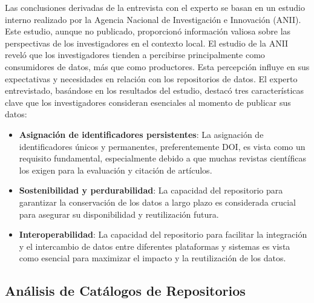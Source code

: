 \documentclass{article}
\begin{document}
Las conclusiones derivadas de la entrevista con el experto se basan en un estudio interno realizado por la Agencia Nacional de Investigación e Innovación (ANII). Este estudio, aunque no publicado, proporcionó información valiosa sobre las perspectivas de los investigadores en el contexto local.
El estudio de la ANII reveló que los investigadores tienden a percibirse principalmente como consumidores de datos, más que como productores. Esta percepción influye en sus expectativas y necesidades en relación con los repositorios de datos.
El experto entrevistado, basándose en los resultados del estudio, destacó tres características clave que los investigadores consideran esenciales al momento de publicar sus datos:
\begin{itemize}
    \item \textbf{Asignación de identificadores persistentes}: La asignación de identificadores únicos y permanentes, preferentemente DOI, es vista como un requisito fundamental, especialmente debido a que muchas revistas científicas los exigen para la evaluación y citación de artículos.
    \item \textbf{Sostenibilidad y perdurabilidad}: La capacidad del repositorio para garantizar la conservación de los datos a largo plazo es considerada crucial para asegurar su disponibilidad y reutilización futura.
    \item \textbf{Interoperabilidad}: La capacidad del repositorio para facilitar la integración y el intercambio de datos entre diferentes plataformas y sistemas es vista como esencial para maximizar el impacto y la reutilización de los datos.
\end{itemize}

\subsection{Análisis de Catálogos de Repositorios}
\end{document}
